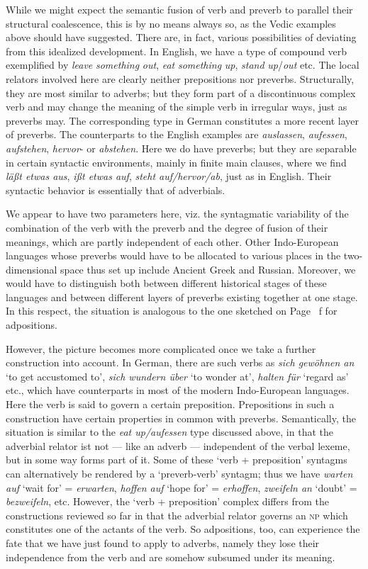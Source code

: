 While we might expect the semantic fusion of verb and preverb to parallel their structural coalescence, this is by no means always so, as the Vedic examples above should have suggested. There are, in fact, various possibilities of deviating from this idealized development. In English, we have a type of compound verb exemplified by \textit{leave} \textit{something} \textit{out}, \textit{eat} \textit{something} \textit{up}, \textit{stand} \textit{up}/\textit{out} etc. The local relators involved here are clearly neither prepositions nor preverbs. Structurally, they are most similar to adverbs; but they form part of a discontinuous complex verb and may change the meaning of the simple verb in irregular ways, just as preverbs may. The corresponding type in German constitutes a more recent layer of preverbs. The counterparts to the English examples are \textit{auslassen}, \textit{aufessen}, \textit{aufstehen}, \textit{hervor}{}- or \textit{abstehen}. Here we do have preverbs; but they are separable in certain syntactic environments, mainly in finite main clauses, where we find \textit{läßt etwas aus}, \textit{ißt etwas auf}, \textit{steht auf/hervor/ab}, just as in English. Their syntactic behavior is essentially that of adverbials.

We appear to have two parameters here, viz. the syntagmatic variability of the combination of the verb with the preverb and the degree of fusion of their meanings, which are partly independent of each other. Other Indo-European languages whose preverbs would have to be allocated to various places in the two-dimensional space thus set up include Ancient Greek and Russian. Moreover, we would have to distinguish both between different historical stages of these languages and between different layers of preverbs existing together at one stage. In this respect, the situation is analogous to the one sketched on Page~\pageref{page102}\chk%
f for adpositions.

However, the picture becomes more complicated once we take a further construction into account. In German, there are such verbs as \textit{sich gewöhnen an} ‘to get accustomed to’, \textit{sich wundern über} ‘to wonder at’, \textit{halten für} ‘regard as’ etc., which have counterparts in most of the modern Indo-European languages. Here the verb is said to govern a certain preposition. Prepositions in such a construction have certain properties in common with preverbs. Semantically, the situation is similar to the \textit{eat up/aufessen} type discussed above, in that the adverbial relator ist not — like an adverb — independent of the verbal lexeme, but in some way forms part of it. Some of these ‘verb + preposition’ syntagms can alternatively be rendered by a ‘preverb-verb’ syntagm; thus we have \textit{warten auf} ‘wait for’ = \textit{erwarten}, \textit{hoffen auf} ‘hope for’ = \textit{erhoffen}, \textit{zweifeln an} ‘doubt’ = \textit{bezweifeln}, etc. However, the ‘verb + preposition’ complex differs from the constructions reviewed so far in that the adverbial relator governs an \textsc{np} which constitutes one of the actants of the verb. So adpositions, too, can experience the fate that we have just found to apply to adverbs, namely they lose their independence from the verb and are somehow subsumed under its meaning.

